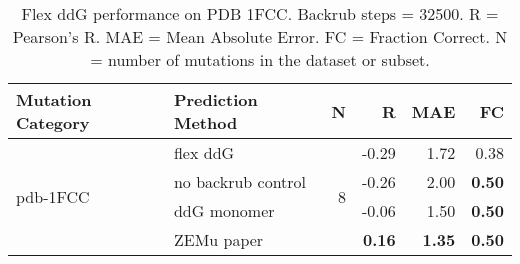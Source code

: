 \begin{table}
  \begin{tabular}{llrrrr}
\toprule
Mutation Category &   Prediction Method &  N &     R &  MAE &   FC \\
\midrule
 \multirow{ 4}{*}{pdb-1FCC} & flex ddG & \multirow{ 4}{*}{8} & -0.29 & 1.72 & 0.38  \\
 & no backrub control & & -0.26 & 2.00 & \textbf{0.50}  \\
 & ddG monomer & & -0.06 & 1.50 & \textbf{0.50}  \\
 & ZEMu paper & & \textbf{0.16} & \textbf{1.35} & \textbf{0.50}  \\
\bottomrule
\end{tabular}
  \caption[Flex ddG performance on PDB 1FCC]{
    Flex ddG performance on PDB 1FCC. Backrub steps = 32500. R = Pearson's R. MAE = Mean Absolute Error. FC = Fraction Correct. N = number of mutations in the dataset or subset.
  } \label{tab:table-pdb-1FCC}
\end{table}
